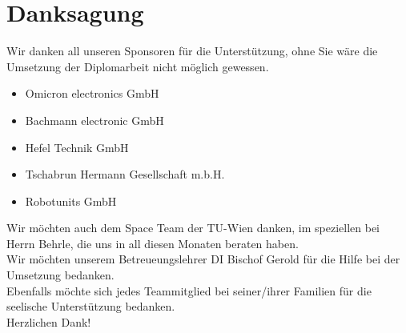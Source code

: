 \section{Danksagung}
Wir danken all unseren Sponsoren für die Unterstützung, ohne Sie wäre die Umsetzung der Diplomarbeit nicht möglich gewessen. \\
\begin{itemize}
	\item Omicron electronics GmbH\autocite{OMICRON_electronics_GmbH}
	\item Bachmann electronic GmbH\autocite{Bachmann_electronic_GmbH}
	\item Hefel Technik GmbH \autocite{Hefel_Technik_GmbH}
	\item Tschabrun Hermann Gesellschaft m.b.H.\autocite{Tschabrun_Hermann_Gesellschaft}
	\item Robotunits GmbH \autocite{robogmbh} 
	
\end{itemize}
Wir möchten auch dem Space Team\autocite{TU_Wien_Spaceteam} der TU-Wien danken, im speziellen bei Herrn Behrle, die uns in all diesen Monaten beraten haben.\\
\vspace{3mm}
Wir möchten unserem Betreueungslehrer DI Bischof Gerold für die Hilfe bei der Umsetzung bedanken.\\
\vspace{3mm}
Ebenfalls möchte sich jedes Teammitglied bei seiner/ihrer Familien für die seelische
Unterstützung bedanken. \\ 
\vspace{20mm}
Herzlichen Dank!